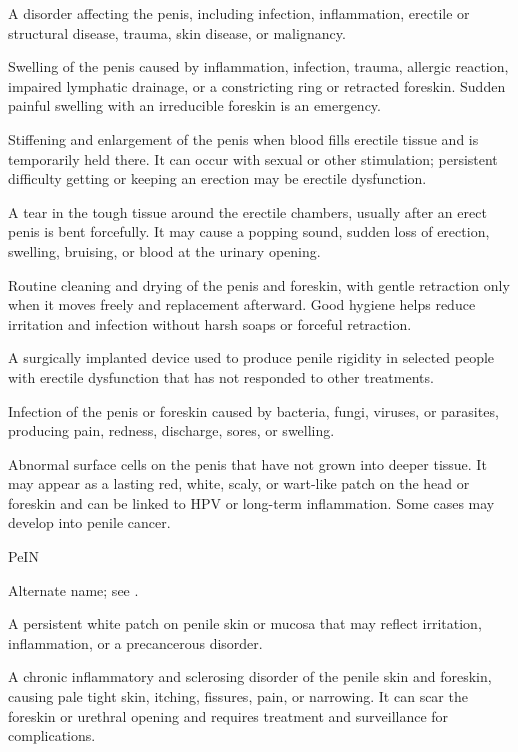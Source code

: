  A disorder affecting the penis, including infection, inflammation, erectile or structural disease, trauma, skin disease, or malignancy.

 Swelling of the penis caused by inflammation, infection, trauma, allergic reaction, impaired lymphatic drainage, or a constricting ring or retracted foreskin. Sudden painful swelling with an irreducible foreskin is an emergency.

 Stiffening and enlargement of the penis when blood fills erectile tissue and is temporarily held there. It can occur with sexual or other stimulation; persistent difficulty getting or keeping an erection may be erectile dysfunction.

 A tear in the tough tissue around the erectile chambers, usually after an erect penis is bent forcefully. It may cause a popping sound, sudden loss of erection, swelling, bruising, or blood at the urinary opening.

 Routine cleaning and drying of the penis and foreskin, with gentle retraction only when it moves freely and replacement afterward. Good hygiene helps reduce irritation and infection without harsh soaps or forceful retraction.

 A surgically implanted device used to produce penile rigidity in selected people with erectile dysfunction that has not responded to other
treatments.

 Infection of the penis or foreskin caused by bacteria, fungi, viruses, or parasites, producing pain, redness, discharge, sores, or swelling.

 Abnormal surface cells on the penis that have not grown into deeper tissue. It may appear as a lasting red, white, scaly, or wart-like patch on the head or foreskin and can be linked to HPV or long-term inflammation. Some cases may develop into penile cancer.

\synonyms
PeIN

 Alternate name; see .

 A persistent white patch on penile skin or mucosa that may reflect irritation, inflammation, or a precancerous disorder.

 A chronic inflammatory and sclerosing disorder of the penile skin and foreskin, causing pale tight skin, itching, fissures, pain, or narrowing. It can scar the foreskin or urethral opening and requires treatment and surveillance for complications.

